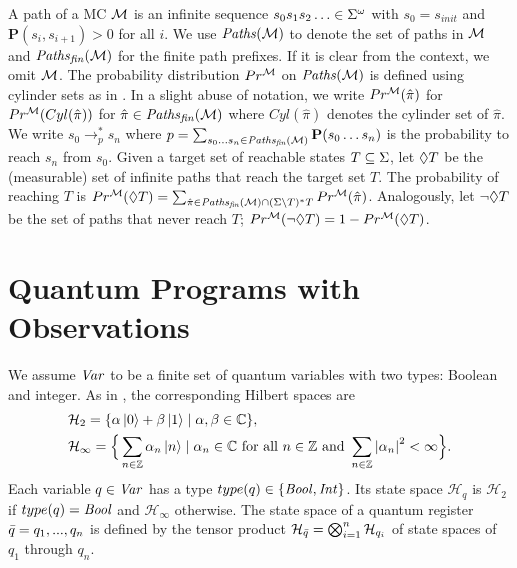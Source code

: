 \documentclass[a4paper,UKenglish,cleveref, autoref, thm-restate]{lipics-v2021}
\begin{document}
A path of a MC $\mathcal{M}$ is an infinite sequence $s_0 s_1 s_2 \ldots \in \Sigma^\omega$ with $s_0 = s_{init}$ and $\textbf{P}(s_i ,s_{i+1})>0$ for all $i$. We use $\mathit{Paths}(\mathcal{M})$ to denote the set of paths in $\mathcal{M}$ and $\mathit{Paths}_{\mathit{fin}}(\mathcal{M})$ for the finite path prefixes. If it is clear from the context, we omit $\mathcal{M}$.
The probability distribution $Pr^{\mathcal{M}}$ on $\mathit{Paths}(\mathcal{M})$ is defined using cylinder sets as in \cite{mcBible}.
In a slight abuse of notation, we write $Pr^{\mathcal{M}}(\hat{\pi})$ for $Pr^{\mathcal{M}}(Cyl(\hat{\pi}))$ for $\hat{\pi}\in \mathit{Paths}_{\mathit{fin}}(\mathcal{M})$ where $Cyl(\hat{\pi})$ denotes the cylinder set of $\hat{\pi}$. We write $s_0 \rightarrow_{p}^* s_n$ where $p = \sum_{s_0 \ldots s_n \in \mathit{Paths}_{\mathit{fin}}(\mathcal{M})} \textbf{P}(s_0 \ldots s_n)$ is the probability to reach $s_n$ from $s_0$.
Given a target set of reachable states $T\subseteq \Sigma$, let $\lozenge T$ be the (measurable) set of infinite paths that reach the target set $T$.
The probability of reaching $T$ is $Pr^{\mathcal{M}}(\lozenge T) = \sum_{\hat{\pi} \in \mathit{Paths}_{\mathit{fin}}(\mathcal{M}) \cap (\Sigma\backslash T)^* T} Pr^{\mathcal{M}}(\hat{\pi})$.
Analogously, let $\neg \lozenge T$ be the set of paths that never reach $T$; $Pr^{\mathcal{M}}(\neg \lozenge T) = 1 - Pr^{\mathcal{M}}(\lozenge T)$.
 \section{Quantum Programs with Observations}
\label{sec:syntaxSemantics}

We assume $\mathit{Var}$ to be a finite set of quantum variables with two types: Boolean and integer. As in \cite{floydHoareLogic}, the corresponding Hilbert spaces are
\begin{align*}
    &\mathcal{H}_2 = \{\alpha \ket{0}+\beta \ket{1} \mid \alpha,\beta \in \mathbb{C}\}, \\
&\mathcal{H}_\infty = \Big \{\sum_{n\in \mathbb{Z}} \alpha_n \ket{n}\mid \alpha_n \in \mathbb{C} \text{ for all }n\in \mathbb{Z}\text{ and } \sum_{n\in \mathbb{Z}} \abs{\alpha_n}^2 < \infty\Big \}.
\end{align*}
Each variable $q\in \mathit{Var}$ has a type $type(q)\in \{\mathit{Bool}, \mathit{Int}\}$. Its state space $\mathcal{H}_q$ is $\mathcal{H}_2$ if $type(q)=\mathit{Bool}$ and $\mathcal{H}_{\infty}$ otherwise.
The state space of a quantum register $\Bar{q} = q_1, ..., q_n$ is defined by the tensor product $\mathcal{H}_{\Bar{q}} =\bigotimes_{i=1}^n \mathcal{H}_{q_i}$ of state spaces of $q_1$ through $q_n$.
\end{document}
